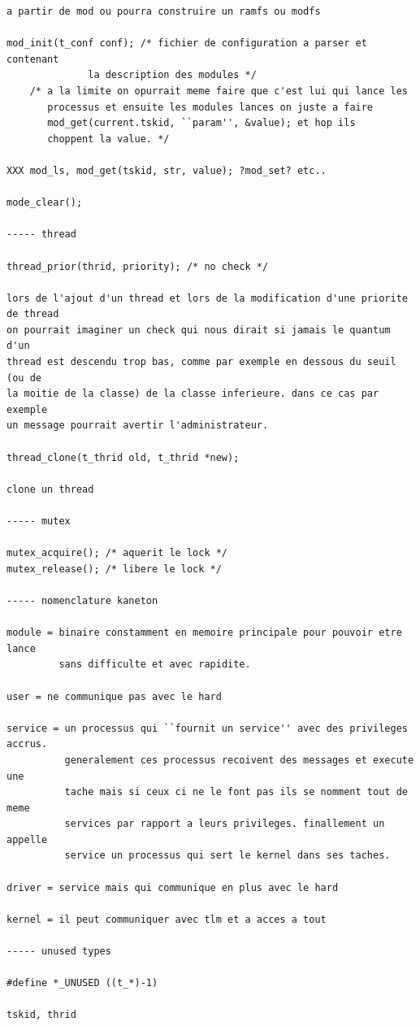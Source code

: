 \documentclass[10pt,a4wide]{article}
\begin{document}
\begin{verbatim}
a partir de mod ou pourra construire un ramfs ou modfs

mod_init(t_conf conf); /* fichier de configuration a parser et contenant
			  la description des modules */
	/* a la limite on opurrait meme faire que c'est lui qui lance les
	   processus et ensuite les modules lances on juste a faire
	   mod_get(current.tskid, ``param'', &value); et hop ils
	   choppent la value. */

XXX mod_ls, mod_get(tskid, str, value); ?mod_set? etc..

mode_clear();

----- thread

thread_prior(thrid, priority); /* no check */

lors de l'ajout d'un thread et lors de la modification d'une priorite de thread
on pourrait imaginer un check qui nous dirait si jamais le quantum d'un
thread est descendu trop bas, comme par exemple en dessous du seuil (ou de
la moitie de la classe) de la classe inferieure. dans ce cas par exemple
un message pourrait avertir l'administrateur.

thread_clone(t_thrid old, t_thrid *new);

clone un thread

----- mutex

mutex_acquire(); /* aquerit le lock */
mutex_release(); /* libere le lock */

----- nomenclature kaneton

module = binaire constamment en memoire principale pour pouvoir etre lance
         sans difficulte et avec rapidite.

user = ne communique pas avec le hard

service = un processus qui ``fournit un service'' avec des privileges accrus.
          generalement ces processus recoivent des messages et execute une
          tache mais si ceux ci ne le font pas ils se nomment tout de meme
          services par rapport a leurs privileges. finallement un appelle
          service un processus qui sert le kernel dans ses taches.

driver = service mais qui communique en plus avec le hard

kernel = il peut communiquer avec tlm et a acces a tout

----- unused types

#define *_UNUSED ((t_*)-1)

tskid, thrid

\end{verbatim}
\end{document}
